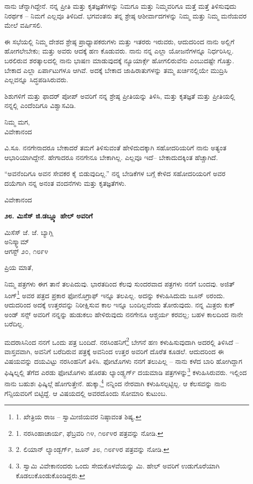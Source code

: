 ನಾನು ಚೆನ್ನಾಗಿದ್ದೇನೆ. ನನ್ನ ಪ್ರೀತಿ ಮತ್ತು ಕೃತಜ್ಞತೆಗಳನ್ನು ನಿಮಗೂ ಮತ್ತು ನಿಮ್ಮವರಿಗೂ ಮತ್ತೆ ಮತ್ತೆ ತಿಳಿಸುವುದು ನಿರರ್ಥಕ – ನಿಮಗೆ ಎಲ್ಲವೂ ತಿಳಿದಿದೆ. ಭಗವಂತನು ತನ್ನ ಶ್ರೇಷ್ಠ ಆಶೀರ್ವಾದಗಳನ್ನು ನಿಮ್ಮ ಮತ್ತು ನಿಮ್ಮ ಮನೆಯವರ ಮೇಲೆ ವರ್ಷಿಸಲಿ.

ಈ ಸಭೆಯಲ್ಲಿ ನಿಮ್ಮ ದೇಶದ ಶ್ರೇಷ್ಠ ಪ್ರಾಧ್ಯಾಪಕರುಗಳು ಮತ್ತು ಇತರರು ಇರುವರು, ಆದುದರಿಂದ ನಾನು ಅಲ್ಲಿಗೆ ಹೋಗಲೇಬೇಕು; ಮತ್ತು ಅವರು ಆದಕ್ಕೆ ಹಣ ಕೊಡುವರು. ನಾನು ನನ್ನ ಎಲ್ಲಾ ಯೋಜನೆಗಳನ್ನೂ ನಿರ್ಧರಿಸಿಲ್ಲ. ಬರಲಿರುವ ಶರತ್ಕಾಲದಲ್ಲಿ ನಾನು ಭಾಷಣ ಮಾಡುವುದಕ್ಕೆ ನ್ಯೂಯಾರ್ಕ್ಗೆ ಹೋಗಲಿರುವೆನು ಎಂಬುದಷ್ಟೇ ಗೊತ್ತು. ಬೇಕಾದ ಎಲ್ಲಾ ಏರ್ಪಾಟುಗಳೂ ಆಗಿವೆ. ಅದಕ್ಕೆ ಬೇಕಾದ ಜಾಹಿರಾತುಗಳನ್ನು ತಮ್ಮ ಖರ್ಚಿನಲ್ಲಿಯೇ ಮುದ್ರಿಸಿ ಎಲ್ಲವನ್ನೂ ಸಿದ್ಧಪಡಿಸಿರುವರು.

ಶಿಶುಗಳಿಗೆ ಮತ್ತು ಫಾದರ್ ಪೋಪ್ ಅವರಿಗೆ ನನ್ನ ಶ್ರೇಷ್ಠ ಪ್ರೀತಿಯನ್ನು ತಿಳಿಸಿ, ಮತ್ತು ಕೃತಜ್ಞತೆ ಮತ್ತು ಪ್ರೀತಿಯಲ್ಲಿ ನನ್ನಲ್ಲಿ ಎಂದೆಂದಿಗೂ ವಿಶ್ವಾಸವಿಡಿ.

\begin{flushright}
ನಿಮ್ಮ ಮಗ,\\ವಿವೇಕಾನಂದ
\end{flushright}

ವಿ.ಸೂ. ನನಗೇನಾದರೂ ಬೇಕಾದರೆ ತಮಗೆ ತಿಳಿಸುವಂತೆ ಹೇಳಿದುದಕ್ಕಾಗಿ ಸಹೋದರಿಯರಿಗೆ ನಾನು ಅತ್ಯಂತ ಆಭಾರಿಯಾಗಿದ್ದೇನೆ. ಹೇಗಾದರೂ ನನಗೇನೂ ಬೇಕಾಗಿಲ್ಲ. ಎಲ್ಲವೂ ಇದೆ– ಬೇಕಾದುದಕ್ಕಿಂತ ಹೆಚ್ಚಾಗಿದೆ.

“ಅವನೆಂದಿಗೂ ಅವನ ಸೇವಕರ ಕೈ ಬಿಡುವುದಿಲ್ಲ.” ನನ್ನ ಬೇಡಿಕೆಗಳ ಬಗ್ಗೆ ಕೇಳಿದ ಸಹೋದರಿಯರಿಗೆ ಅವರ ದಯೆಗಾಗಿ ನನ್ನ ಅನಂತ ವಂದನೆಗಳು ಮತ್ತು ಕೃತಜ್ಞತೆಗಳು.

\begin{flushright}
ವಿವೇಕಾನಂದ
\end{flushright}

\begin{center}
\textbf{೨೮. ಮಿಸೆಸ್ ಜಿ.ಡಬ್ಲ್ಯೂ ಹೇಲ್ ಅವರಿಗೆ}
\end{center}

\begin{flushright}
 ಮಿಸೆಸ್ ಜೆ. ಜೆ. ಬ್ಯಾಗ್ಲಿ\\ಅನಿಸ್ಕ್ವಾಮ್​\\ಆಗಸ್ಟ್ ೨೦, ೧೮೯೪
\end{flushright}

ಪ್ರಿಯ ಮಾತೆ,

ನಿಮ್ಮ ಪತ್ರಗಳು ಈಗ ತಾನೆ ತಲಪಿದುವು. ಭಾರತದಿಂದ ಕೆಲವು ಸುಂದರವಾದ ಪತ್ರಗಳು ನನಗೆ ಬಂದವು. ಅಜಿತ್ ಸಿಂಗ್\footnote{1. ಖೇತ್ರಿಯ ರಾಜ – ಸ್ವಾಮೀಜಿಯವರ ನಿಷ್ಠಾವಂತ ಶಿಷ್ಯ.} ಅವರ ಪತ್ರದ ಪ್ರಕಾರ ಫೋನೊಗ್ರಾಫ್ ಇನ್ನೂ ತಲಪಿಲ್ಲ. ಅದನ್ನು ಕಳುಹಿಸಿದುದು ಜೂನ್ ೮ರಂದು. ಆದುದರಿಂದ ಅದಕ್ಕೆ ಉತ್ತರವನ್ನು ನಿರೀಕ್ಷಿಸುವ ಕಾಲ ಇನ್ನೂ ಬಂದಿಲ್ಲವೆಂದು ತೋರುವುದು. ನನ್ನ ಮಿತ್ರರು ಕುಕ್ ಅಂಡ್ ಸನ್ಸ್ ಅವರಿಗೆ ನನ್ನನ್ನು ಹುಡುಕಲು ಹೇಳಿರುವುದು ನನಗೇನೂ ಆಶ್ಚರ್ಯ ಕರವಲ್ಲ; ಬಹಳ ಕಾಲದಿಂದ ನಾನೇ ಬರೆದಿಲ್ಲ.

ಮದರಾಸಿನಿಂದ ನನಗೆ ಒಂದು ಪತ್ರ ಬಂದಿದೆ. ನರಸಿಂಹನಿಗೆ\footnote{1. ನರಸಿಂಹಾಚಾರ್ಯ, ಫೆಬ್ರವರಿ ೧೪, ೧೮೯೪ರ ಪತ್ರವನ್ನು ನೋಡಿ.} ಬೇಗನೆ ಹಣ ಕಳುಹಿಸುವುದಾಗಿ ಅದರಲ್ಲಿ ತಿಳಿಸಿದೆ – ವಾಸ್ತವವಾಗಿ, ಅವನಿಗೆ ಬರೆದಿರುವ ಪತ್ರಕ್ಕೆ ಅವನಿಂದ ಉತ್ತರ ಅವರಿಗೆ ದೊರೆತ ಕೂಡಲೆ. ಆದುದರಿಂದ ಈ ವಿಷಯವನ್ನು ದಯವಿಟ್ಟು ನರಸಿಂಹನಿಗೆ ತಿಳಿಸಿ. ಫೋಟೊಗಳು ನನಗೆ ತಲುಪಿಲ್ಲ – ನಾನು ಕಳೆದ ಬಾರಿ ಹೋಗಿದ್ದಾಗ ಫಿಷ್ಕಿಲ್ನಲ್ಲಿ ತೆಗೆದ ಎರಡು ಫೋಟೊಗಳು ಹೊರತು ಲ್ಯಾಂಡ್ಸ್ಬರ್ಗ್ ದಯಮಾಡಿ ಪತ್ರಗಳನ್ನು\footnote{2. ಲಿಯಾನ್ ಲ್ಯಾಂಡ್ಬರ್ಗ್, ಜೂನ್ ೨೮, ೧೮೯೪ರ ಪತ್ರವನ್ನು ನೋಡಿ.} ಕಳುಹಿಸಿರುವರು. ಇಲ್ಲಿಂದ ನಾನು ಬಹುಶಃ ಫಿಷ್ಕಿಲ್ಗೆ ಹೋಗುತ್ತೇನೆ. ಹುಕ್ಕಾ,\footnote{3. ಸ್ವಾಮಿ ವಿವೇಕಾನಂದರು ಒಂದು ಸೇದುಕೊಳವೆಯನ್ನು ಮಿ. ಹೇಲ್ ಅವರಿಗೆ ಉಡುಗೊರೆಯಾಗಿ ಕೊಡಲುಕೊಂಡುಕೊಂಡಿದ್ದರು.} ನನ್ನಿಂದ ನೇರವಾಗಿ ಕಳುಹಿಸಲ್ಪಟ್ಟಿಲ್ಲ. ಆ ಕೆಲಸವನ್ನು ನಾನು ಗೆನ್ಸಿಯವರಿಗೆ ಬಿಟ್ಟಿದ್ದೆ. ಆ ವಿಷಯದಲ್ಲಿ ಅವರದೊಂದು ಸೋಮಾರಿ ಕುಟುಂಬ.

